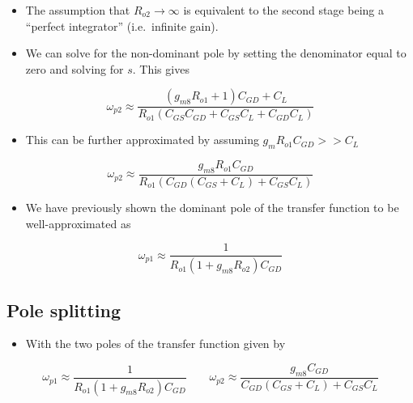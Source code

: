 \documentclass[11pt]{article}
\providecommand{\tightlist}{%
      \setlength{\itemsep}{0pt}\setlength{\parskip}{0pt}}
\begin{document}
\begin{itemize}
\tightlist
\item
  The assumption that \(R_{o2} \rightarrow \infty\) is equivalent to the
  second stage being a ``perfect integrator'' (i.e.~infinite gain).
\end{itemize}

    \begin{itemize}
\tightlist
\item
  We can solve for the non-dominant pole by setting the denominator
  equal to zero and solving for \(s\). This gives
\end{itemize}

\begin{equation}
\omega_{p2} \approx \dfrac{(g_{m8}R_{o1}+1)C_{GD}+C_L}{R_{o1}(C_{GS}C_{GD}+C_{GS}C_L+C_{GD}C_L)
}\end{equation}

\begin{itemize}
\tightlist
\item
  This can be further approximated by assuming
  \(g_{m}R_{o1}C_{GD} >> C_L\)
\end{itemize}

\begin{equation}
\omega_{p2} \approx \dfrac{g_{m8}R_{o1}C_{GD}}{R_{o1}(C_{GD}(C_{GS}+C_L)+C_{GS}C_L)
}\end{equation}

\begin{itemize}
\tightlist
\item
  We have previously shown the dominant pole of the transfer function to
  be well-approximated as
\end{itemize}

\begin{equation}
\omega_{p1} \approx \dfrac{1}{R_{o1}(1+g_{m8} R_{o2})C_{GD}}
\end{equation}

    \hypertarget{pole-splitting}{%
\subsection{Pole splitting}\label{pole-splitting}}

    \begin{itemize}
\tightlist
\item
  With the two poles of the transfer function given by
\end{itemize}

\begin{equation}
\omega_{p1} \approx \dfrac{1}{R_{o1}(1+g_{m8} R_{o2})C_{GD}} \:\:\:\:\:\:\:\:\: \omega_{p2} \approx \dfrac{g_{m8}C_{GD}}{C_{GD}(C_{GS}+C_L)+C_{GS}C_L}
\end{equation}
\end{document}
